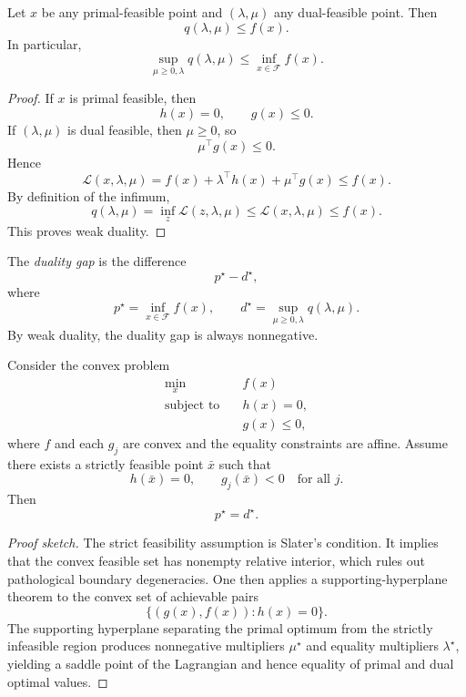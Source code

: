 \begin{theorem}\label{thm:l3-weak-duality}
	Let $x$ be any primal-feasible point and $(\lambda,\mu)$ any dual-feasible point. Then
	\[
		q(\lambda,\mu)\le f(x).
	\]
	In particular,
	\[
		\sup_{\mu \ge 0,\lambda} q(\lambda,\mu)
		\le
		\inf_{x \in \mathcal{F}} f(x).
	\]
\end{theorem}
\begin{proof}
	If $x$ is primal feasible, then
	\[
		h(x)=0,
		\qquad
		g(x)\le 0.
	\]
	If $(\lambda,\mu)$ is dual feasible, then $\mu \ge 0$, so
	\[
		\mu^\top g(x)\le 0.
	\]
	Hence
	\[
		\mathcal{L}(x,\lambda,\mu)
		=
		f(x)+\lambda^\top h(x)+\mu^\top g(x)
		\le
		f(x).
	\]
	By definition of the infimum,
	\[
		q(\lambda,\mu)=\inf_z \mathcal{L}(z,\lambda,\mu)\le \mathcal{L}(x,\lambda,\mu)\le f(x).
	\]
	This proves weak duality.
\end{proof}

\begin{definition}\label{def:l3-duality-gap}
	The \emph{duality gap} is the difference
	\[
		p^\star-d^\star,
	\]
	where
	\[
		p^\star=\inf_{x \in \mathcal{F}} f(x),
		\qquad
		d^\star=\sup_{\mu \ge 0,\lambda} q(\lambda,\mu).
	\]
	By weak duality, the duality gap is always nonnegative.
\end{definition}

\begin{theorem}\label{thm:l3-strong-duality-under-slater-s-condition}
	Consider the convex problem
	\begin{align*}
		\min_x \quad & f(x) \\
		\text{subject to}\quad & h(x)=0, \\
		                       & g(x)\le 0,
	\end{align*}
	where $f$ and each $g_j$ are convex and the equality constraints are affine. Assume there exists a strictly feasible point $\bar x$ such that
	\[
		h(\bar x)=0,
		\qquad
		g_j(\bar x)<0 \quad \text{for all } j.
	\]
	Then
	\[
		p^\star=d^\star.
	\]
\end{theorem}
\begin{proof}[Proof sketch]
	The strict feasibility assumption is Slater's condition. It implies that the convex feasible set has nonempty relative interior, which rules out pathological boundary degeneracies. One then applies a supporting-hyperplane theorem to the convex set of achievable pairs
	\[
		\{(g(x),f(x)) : h(x)=0\}.
	\]
	The supporting hyperplane separating the primal optimum from the strictly infeasible region produces nonnegative multipliers $\mu^\star$ and equality multipliers $\lambda^\star$, yielding a saddle point of the Lagrangian and hence equality of primal and dual optimal values.
\end{proof}


